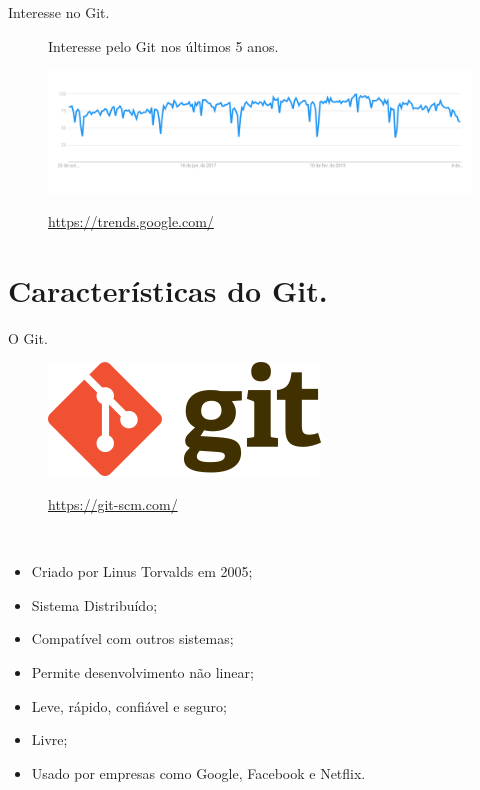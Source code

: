 \documentclass[brazil,aspectratio=169]{beamer}
\begin{document}
\begin{frame}{Interesse no Git.}

  \begin{figure}
    \centering
    Interesse pelo Git nos últimos 5 anos.   
    
    \includegraphics[scale=1]{imagens/git-trends-google}	   
    
    \url{https://trends.google.com/}
  \end{figure}

\end{frame}

\section{Características do Git.}
\begin{frame}{O Git.}
\begin{figure}
  \centering
  \includegraphics[scale=0.35]{imagens/git-logo}
  
  \url{https://git-scm.com/}
\end{figure}

\begin{block}{\ }
\begin{itemize}
 \item Criado por Linus Torvalds em 2005;
 \item Sistema Distribuído;
 \item Compatível com outros sistemas;
 \item Permite desenvolvimento não linear;
 \item Leve, rápido, confiável e seguro;
 \item Livre;
 \item Usado por empresas como Google, Facebook e Netflix.
\end{itemize}
\end{block}

\end{frame}
\end{document}
